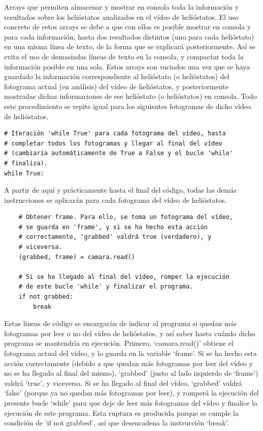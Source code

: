 Arrays que permiten almacenar y mostrar en consola toda la información y resultados sobre los helióstatos analizados en el vídeo de helióstatos. El uso concreto de estos arrays se debe a que con ellos es posible mostrar en consola y para cada información, hasta dos resultados distintos (uno para cada helióstato) en una misma línea de texto, de la forma que se explicará posteriormente. Así se evita el uso de demasiadas líneas de texto en la consola, y compactar toda la información posible en una sola. Estos arrays son vaciados una vez que se haya guardado la información correspondiente al helióstato (o helióstatos) del fotograma actual (en análisis) del vídeo de helióstatos, y posteriormente mostradas dichas informaciones de ese helióstato (o helióstatos) en consola. Todo este procedimiento se repite igual para los siguientes fotogramas de dicho vídeo de helióstatos.\\[20pt]

\begin{lstlisting}
# Iteración 'while True' para cada fotograma del vídeo, hasta
# completar todos los fotogramas y llegar al final del vídeo
# (cambiaría automáticamente de True a False y el bucle 'while'
# finaliza).
while True:
\end{lstlisting}

A partir de aquí y prácticamente hasta el final del código, todas las demás instrucciones se aplicarán para cada fotograma del vídeo de helióstatos.\\[20pt]
    
\begin{lstlisting}
    # Obtener frame. Para ello, se toma un fotograma del vídeo,
    # se guarda en 'frame', y si se ha hecho esta acción
    # correctamente, 'grabbed' valdrá true (verdadero), y
    # viceversa.
    (grabbed, frame) = camara.read()

    # Si se ha llegado al final del vídeo, romper la ejecución
    # de este bucle 'while' y finalizar el programa.
    if not grabbed:
        break
\end{lstlisting}

Estas líneas de código se encargarán de indicar al programa si quedan más fotogramas por leer o no del vídeo de helióstatos, y así saber hasta cuándo dicho programa se mantendría en ejecución. Primero, ‘camara.read()’ obtiene el fotograma actual del vídeo, y lo guarda en la variable ‘frame’. Si se ha hecho esta acción correctamente (debido a que quedan más fotogramas por leer del vídeo y no se ha llegado al final del mismo), ‘grabbed’ (justo al lado izquierdo de ‘frame’) valdrá ‘true’, y viceversa. Si se ha llegado al final del vídeo, ‘grabbed’ valdrá ‘false’ (porque ya no quedan más fotogramas por leer), y romperá la ejecución del presente bucle ‘while’ para que deje de leer más fotogramas del vídeo y finalice la ejecución de este programa. Esta ruptura es producida porque se cumple la condición de ‘if not grabbed’, así que desencadena la instrucción ‘break’.\\[20pt]

